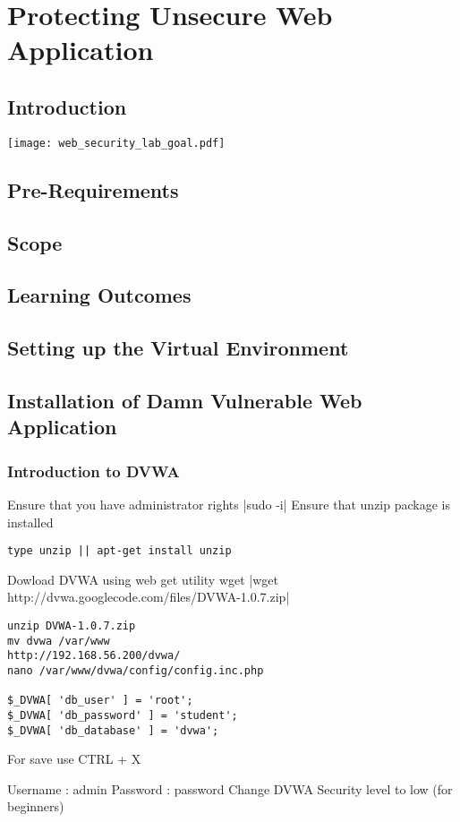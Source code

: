 \chapter{Protecting Unsecure Web Application}
\label{Protecting Unsecure Web Application}
\section{Introduction}
\texttt{[image: web\_security\_lab\_goal.pdf]}
\section{Pre-Requirements} 
\section{Scope}
\section{Learning Outcomes} 
\section{Setting up the Virtual Environment}
\section{Installation of Damn Vulnerable Web Application}
\subsection{Introduction to DVWA}

Ensure that you have administrator rights
|sudo -i|
Ensure that unzip package is installed
\begin{verbatim}
type unzip || apt-get install unzip
\end{verbatim}
Dowload DVWA using web get utility wget
|wget http://dvwa.googlecode.com/files/DVWA-1.0.7.zip|

\begin{verbatim}
unzip DVWA-1.0.7.zip
mv dvwa /var/www
http://192.168.56.200/dvwa/
nano /var/www/dvwa/config/config.inc.php

$_DVWA[ 'db_user' ] = 'root';
$_DVWA[ 'db_password' ] = 'student';
$_DVWA[ 'db_database' ] = 'dvwa';
\end{verbatim}
For save use  CTRL + X

Username : admin
Password : password
Change DVWA Security level to low (for beginners)


